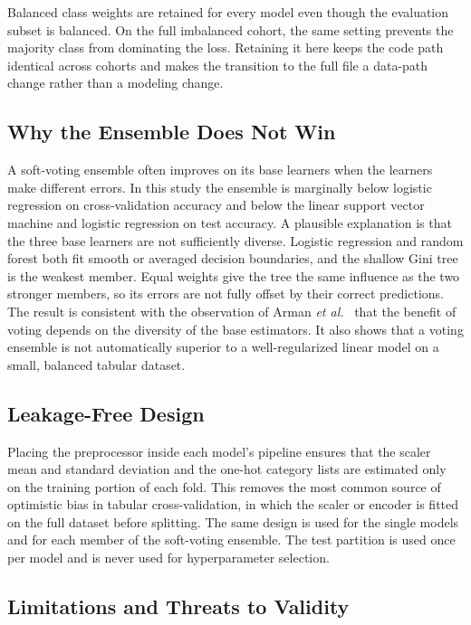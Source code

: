 \documentclass[conference]{IEEEtran}
\begin{document}
Balanced class weights are retained for every model even though the evaluation subset is balanced. On the full imbalanced cohort, the same setting prevents the majority class from dominating the loss. Retaining it here keeps the code path identical across cohorts and makes the transition to the full file a data-path change rather than a modeling change.

\subsection{Why the Ensemble Does Not Win}

A soft-voting ensemble often improves on its base learners when the learners make different errors. In this study the ensemble is marginally below logistic regression on cross-validation accuracy and below the linear support vector machine and logistic regression on test accuracy. A plausible explanation is that the three base learners are not sufficiently diverse. Logistic regression and random forest both fit smooth or averaged decision boundaries, and the shallow Gini tree is the weakest member. Equal weights give the tree the same influence as the two stronger members, so its errors are not fully offset by their correct predictions. The result is consistent with the observation of Arman \textit{et al.}~\cite{arman2025cjms} that the benefit of voting depends on the diversity of the base estimators. It also shows that a voting ensemble is not automatically superior to a well-regularized linear model on a small, balanced tabular dataset.

\subsection{Leakage-Free Design}

Placing the preprocessor inside each model's pipeline ensures that the scaler mean and standard deviation and the one-hot category lists are estimated only on the training portion of each fold. This removes the most common source of optimistic bias in tabular cross-validation, in which the scaler or encoder is fitted on the full dataset before splitting. The same design is used for the single models and for each member of the soft-voting ensemble. The test partition is used once per model and is never used for hyperparameter selection.

\subsection{Limitations and Threats to Validity}
\end{document}
